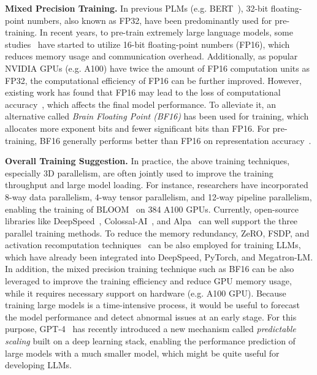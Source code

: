 \textbf{Mixed Precision Training.} In previous PLMs (e.g. BERT~\cite{Devlin-NAACL-2019-BERT}), 32-bit floating-point numbers, also known as FP32, have been predominantly used for pre-training. In recent years, to pre-train extremely large language models, some studies~\cite{Micikevicius-arXiv-2017-Mixed} have started to utilize 16-bit floating-point numbers (FP16), which reduces memory usage and communication overhead. Additionally, as popular NVIDIA GPUs (e.g. A100) have twice the amount of FP16 computation units as FP32, the computational efficiency of FP16 can be further improved. However, existing work has  found that FP16 may lead to the loss of {computational accuracy~\cite{Scao-arxiv-2022-BLOOM,Rae-arxiv-2021-Scaling}}, which affects the final model performance. To alleviate it,  an alternative called \emph{Brain Floating Point (BF16)} has been used for training, which {allocates more exponent bits and fewer significant bits than FP16.} For pre-training, BF16 generally performs better than FP16 on representation accuracy~\cite{Scao-arxiv-2022-BLOOM}. 

\textbf{Overall Training Suggestion.} In practice, the above training techniques, especially 3D parallelism, are often jointly used to improve the training throughput and  large model loading. For instance, researchers have incorporated 8{-way} data parallelism, 4{-way} tensor parallelism, and 12{-way} pipeline parallelism, enabling the training of BLOOM~\cite{Scao-arxiv-2022-BLOOM} on 384 A100 GPUs. Currently, open-source libraries like DeepSpeed~\cite{Rasley-KDD-2020-DeepSpeed}, Colossal-AI~\cite{Bian-CoRR-2021-Colossal-AI}, and Alpa~\cite{Zheng-OSDI-2022-Alpa} can well support the three parallel training methods. {To reduce the memory redundancy, ZeRO, FSDP, and activation recomputation techniques~\cite{Chen-arxiv-2016-training,Korthikanti-arxiv-2022-reducing} can be also employed for training LLMs,  which have already been integrated into DeepSpeed, PyTorch, and Megatron-LM. } In addition, the mixed precision training technique such as BF16 can be also leveraged to improve the training efficiency and reduce GPU memory usage, while it  requires necessary support on hardware (e.g. A100 GPU). Because training large models is a time-intensive process, it would be useful to forecast the model performance and detect abnormal issues at an early stage. For this purpose, GPT-4~\cite{OpenAI-OpenAI-2023-GPT-4} has recently introduced a new mechanism called \emph{predictable scaling} built on a deep learning stack, enabling the performance prediction of large models with a much smaller model, which might be quite useful for developing LLMs.  

